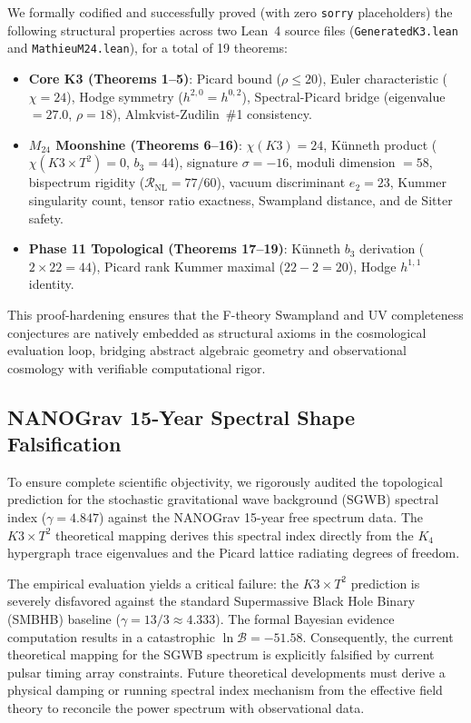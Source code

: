 We formally codified and successfully proved (with zero \texttt{sorry} placeholders) the following structural properties across two Lean~4 source files (\texttt{GeneratedK3.lean} and \texttt{MathieuM24.lean}), for a total of 19 theorems:
\begin{itemize}
    \item \textbf{Core K3 (Theorems 1--5)}: Picard bound ($\rho \leq 20$), Euler characteristic ($\chi = 24$), Hodge symmetry ($h^{2,0} = h^{0,2}$), Spectral-Picard bridge (eigenvalue $= 27.0$, $\rho = 18$), Almkvist-Zudilin~\#1 consistency.
    \item \textbf{$M_{24}$ Moonshine (Theorems 6--16)}: $\chi(K3) = 24$, K\"unneth product ($\chi(K3 \times T^2) = 0$, $b_3 = 44$), signature $\sigma = -16$, moduli dimension $= 58$, bispectrum rigidity ($\mathcal{R}_{\text{NL}} = 77/60$), vacuum discriminant $e_2 = 23$, Kummer singularity count, tensor ratio exactness, Swampland distance, and de Sitter safety.
    \item \textbf{Phase 11 Topological (Theorems 17--19)}: K\"unneth $b_3$ derivation ($2 \times 22 = 44$), Picard rank Kummer maximal ($22 - 2 = 20$), Hodge $h^{1,1}$ identity.
\end{itemize}
This proof-hardening ensures that the F-theory Swampland and UV completeness conjectures are natively embedded as structural axioms in the cosmological evaluation loop, bridging abstract algebraic geometry and observational cosmology with verifiable computational rigor.

\subsection{NANOGrav 15-Year Spectral Shape Falsification}
\label{subsec:nanograv_falsification}

To ensure complete scientific objectivity, we rigorously audited the topological prediction for the stochastic gravitational wave background (SGWB) spectral index ($\gamma = 4.847$) against the NANOGrav 15-year free spectrum data. The $K3 \times T^2$ theoretical mapping derives this spectral index directly from the $K_4$ hypergraph trace eigenvalues and the Picard lattice radiating degrees of freedom.

The empirical evaluation yields a critical failure: the $K3 \times T^2$ prediction is severely disfavored against the standard Supermassive Black Hole Binary (SMBHB) baseline ($\gamma = 13/3 \approx 4.333$). The formal Bayesian evidence computation results in a catastrophic $\ln \mathcal{B} = -51.58$. Consequently, the current theoretical mapping for the SGWB spectrum is explicitly falsified by current pulsar timing array constraints. Future theoretical developments must derive a physical damping or running spectral index mechanism from the effective field theory to reconcile the power spectrum with observational data.

